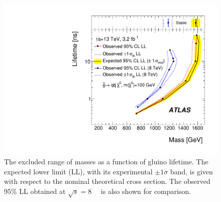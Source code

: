 \begin{figure}[htbp]
\centering
\includegraphics[width=\fullfig]{figures/taumass_exclusion.pdf}  
\caption{The excluded range of masses as a function of gluino lifetime. The expected lower limit (LL), with its experimental $\pm 1 \sigma$ band, is given with respect to the nominal theoretical cross section. The observed 95\% LL obtained at $\sqrt{s} = 8$~\TeV~\cite{SUSY-2014-09} is also shown for comparison.}
\label{fig:mass_limits}
\end{figure}

